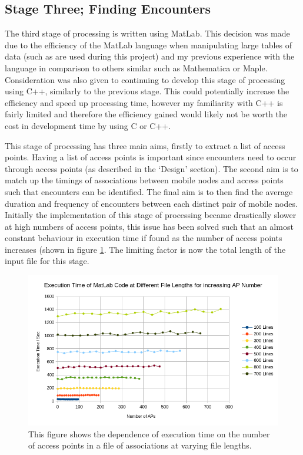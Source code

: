 \subsection{Stage Three; Finding Encounters} 

The third stage of processing is written using MatLab. This decision was made due to the efficiency of the MatLab language when manipulating large tables of data (such as are used during this project) and my previous experience with the language in comparison to others similar such as Mathematica or Maple. Consideration was also given to continuing to develop this stage of processing using C++, similarly to the previous stage. This could potentially increase the efficiency and speed up processing time, however my familiarity with C++ is fairly limited and therefore the efficiency gained would likely not be worth the cost in development time by using C or C++.

This stage of processing has three main aims, firstly to extract a list of access points. Having a list of access points is important since encounters need to occur through access points (as described in the `Design' section). The second aim is to match up the timings of associations between mobile nodes and access points such that encounters can be identified. The final aim is to then find the average duration and frequency of encounters between each distinct pair of mobile nodes. Initially the implementation of this stage of processing became drastically slower at high numbers of access points, this issue has been solved such that an almost constant behaviour in execution time if found as the number of access points increases (shown in figure \ref{fig:AP_vs_time}. The limiting factor is now the total length of the input file for this stage.

\begin{figure}[h]
    \centering
    \includegraphics[width=\textwidth]{implementaion/AP_no_vs_time.png}
    \caption{This figure shows the dependence of execution time on the number of access points in a file of associations at varying file lengths.}
    \label{fig:AP_vs_time}
\end{figure}